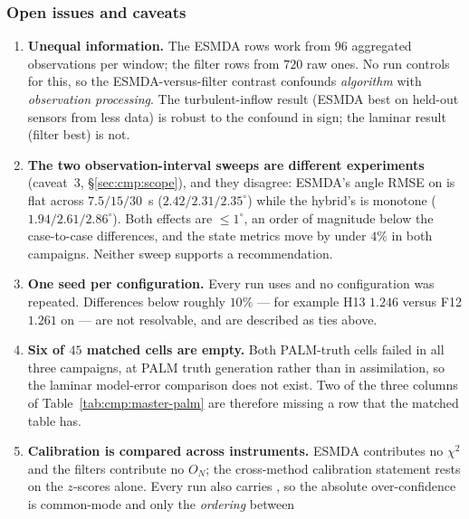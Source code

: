 \subsubsection{Open issues and caveats}
\label{sec:cmp:caveats}

\begin{enumerate}[nosep,leftmargin=1.6em]
  \item \textbf{Unequal information.} The ESMDA rows work from $96$
        aggregated observations per window; the filter rows from $720$ raw
        ones. No run controls for this, so the ESMDA-versus-filter contrast
        confounds \emph{algorithm} with \emph{observation processing}. The
        turbulent-inflow result (ESMDA best on held-out sensors from less
        data) is robust to the confound in sign; the laminar result (filter
        best) is not.
  \item \textbf{The two observation-interval sweeps are different
        experiments} (caveat~3, \S\ref{sec:cmp:scope}), and they disagree:
        ESMDA's angle RMSE on  is flat across
        $7.5/15/30$~s ($2.42/2.31/2.35^\circ$) while the hybrid's is monotone
        ($1.94/2.61/2.86^\circ$). Both effects are $\leq 1^\circ$, an
        order of magnitude below the case-to-case differences, and the state
        metrics move by under $4\%$ in both campaigns. Neither sweep supports a
        recommendation.
  \item \textbf{One seed per configuration.} Every run uses  and
        no configuration was repeated. Differences below roughly $10\%$ ---
        for example H13 $1.246$ versus F12 $1.261$ on
         --- are not resolvable, and are described as ties
        above.
  \item \textbf{Six of $45$ matched cells are empty.} Both PALM-truth
         cells failed in all three campaigns, at PALM truth
        generation rather than in assimilation, so the laminar model-error
        comparison does not exist. Two of the three columns of
        Table~\ref{tab:cmp:master-palm} are therefore missing a row that the
        matched table has.
  \item \textbf{Calibration is compared across instruments.} ESMDA
        contributes no $\chi^2$ and the filters contribute no $O_N$; the
        cross-method calibration statement rests on the $z$-scores alone.
        Every run also carries
        , so the absolute
        over-confidence is common-mode and only the \emph{ordering} between

\end{enumerate}
